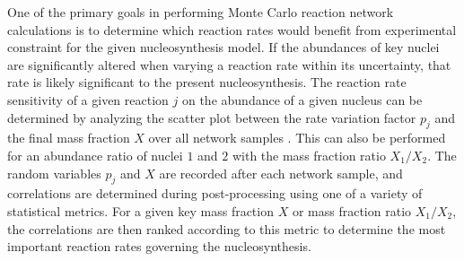 One of the primary goals in performing Monte Carlo reaction network calculations is to determine which reaction rates would benefit from experimental constraint for the given nucleosynthesis model. If the abundances of key nuclei are significantly altered when varying a reaction rate within its uncertainty, that rate is likely significant to the present nucleosynthesis.
The reaction rate sensitivity of a given reaction $j$ on the abundance of a given nucleus can be determined by analyzing the scatter plot between the rate variation factor $p_{j}$ and the final mass fraction $X$ over all network samples \cite{Iliadis2015b}. This can also be performed for an abundance ratio of nuclei $1$ and $2$ with the mass fraction ratio $X_{1}/X_{2}$. The random variables $p_{j}$ and $X$ are recorded after each network sample, and correlations are determined during post-processing using one of a variety of statistical metrics. For a given key mass fraction $X$ or mass fraction ratio $X_{1}/X_{2}$, the correlations are then ranked according to this metric to determine the most important reaction rates governing the nucleosynthesis.

